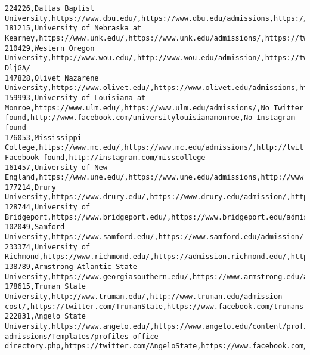 \documentclass[11pt]{article}
\begin{document}
\begin{Verbatim}[commandchars=\\\{\}]
224226,Dallas Baptist University,https://www.dbu.edu/,https://www.dbu.edu/admissions,https://www.twitter.com/dbupatriots,https://www.facebook.com/DallasBaptistUniv,https://www.instagram.com/DBUPatriots/
181215,University of Nebraska at Kearney,https://www.unk.edu/,https://www.unk.edu/admissions/,https://twitter.com/UNKearney,https://www.facebook.com/UNKearney,http://instagram.com/UNKearney
210429,Western Oregon University,http://www.wou.edu/,http://www.wou.edu/admission/,https://twitter.com/wounews,https://www.facebook.com/WOUnews,https://www.instagram.com/p/BohZd-DljGA/
147828,Olivet Nazarene University,https://www.olivet.edu/,https://www.olivet.edu/admissions,https://twitter.com/olivetnazarene,https://www.facebook.com/OlivetNazareneUniversity/,https://www.instagram.com/olivetnazarene/
159993,University of Louisiana at Monroe,https://www.ulm.edu/,https://www.ulm.edu/admissions/,No Twitter found,http://www.facebook.com/universitylouisianamonroe,No Instagram found
176053,Mississippi College,https://www.mc.edu/,https://www.mc.edu/admissions/,http://twitter.com/misscollege,No Facebook found,http://instagram.com/misscollege
161457,University of New England,https://www.une.edu/,https://www.une.edu/admissions,http://www.twitter.com/unetweets,http://www.facebook.com/universityofnewengland,http://instagram.com/uniofnewengland
177214,Drury University,https://www.drury.edu/,https://www.drury.edu/admission/,https://twitter.com/DruryUniversity,https://www.facebook.com/DruryUniversity,https://instagram.com/DruryUniversity
128744,University of Bridgeport,https://www.bridgeport.edu/,https://www.bridgeport.edu/admissions/,https://twitter.com/UBridgeport,https://www.facebook.com/UBridgeport,http://instagram.com/ubridgeport
102049,Samford University,https://www.samford.edu/,https://www.samford.edu/admission/,https://twitter.com/SamfordU/,https://www.facebook.com/SamfordUniversity,https://instagram.com/samfordu/
233374,University of Richmond,https://www.richmond.edu/,https://admission.richmond.edu/,https://twitter.com/urichmond,https://www.facebook.com/urichmond,https://www.instagram.com/urichmond/
138789,Armstrong Atlantic State University,https://www.georgiasouthern.edu/,https://www.armstrong.edu/armstrong/1/admissions,http://twitter.com/georgiasouthern,https://www.facebook.com/GeorgiaSouthern,http://instagram.com/georgiasouthernuniversity
178615,Truman State University,http://www.truman.edu/,http://www.truman.edu/admission-cost/,https://twitter.com/TrumanState,https://www.facebook.com/trumanstateuniversity,https://instagram.com/trumanphotos/
222831,Angelo State University,https://www.angelo.edu/,https://www.angelo.edu/content/profiles/2495-admissions/Templates/profiles-office-directory.php,https://twitter.com/AngeloState,https://www.facebook.com/angelostateuniversity,https://www.instagram.com/angelostate/

\end{Verbatim}
\end{document}

